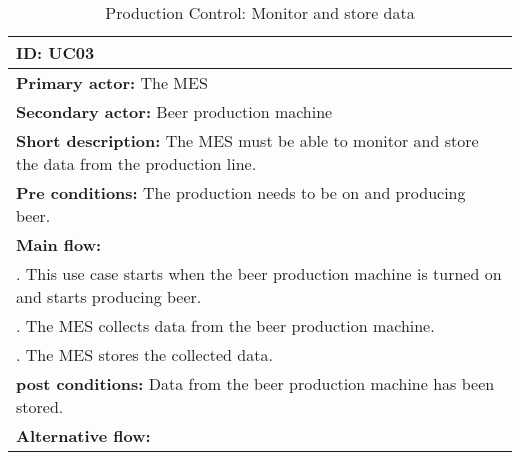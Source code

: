 \begin{table}[ht]
    \begin{tabularx}{\textwidth}{|>{\RaggedRight}X|}
        \hline
        \textbf{ID:} UC03  \\
        \hline
        \textbf{Primary actor:} The MES \\
        \hline
        \textbf{Secondary actor:} Beer production machine \\
        \hline
        \textbf{Short description:} The MES must be able to monitor and store
        the data from the production line. \\
        \hline
        \textbf{Pre conditions:} The production needs to be on and producing
        beer. \\
        \hline
        \textbf{Main flow:} \\
        	1. This use case starts when the beer production machine is turned
        	on and starts producing beer. \\
			2. The MES collects data from the beer production machine. \\
			3. The MES stores the collected data. \\
		\hline
        \textbf{post conditions:} Data from the beer production machine has been
        stored. \\
        \hline
        \textbf{Alternative flow:} \\
        \hline
    \end{tabularx}
    \caption{Production Control: Monitor and store data} 
    \label{table:usecase_productionStoreData}
\end{table}

